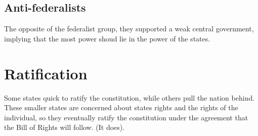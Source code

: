 \subsection{Anti-federalists}
The opposite of the federalist group, they supported a weak central government,
implying that the most power shoud lie in the power of the states.

\section{Ratification}
Some states quick to ratify the constitution, while others pull the nation
behind.  These smaller states are concerned about states rights and the rights
of the individual, so they eventually ratify the constitution under the
agreement that the Bill of Rights will follow.  (It does).
